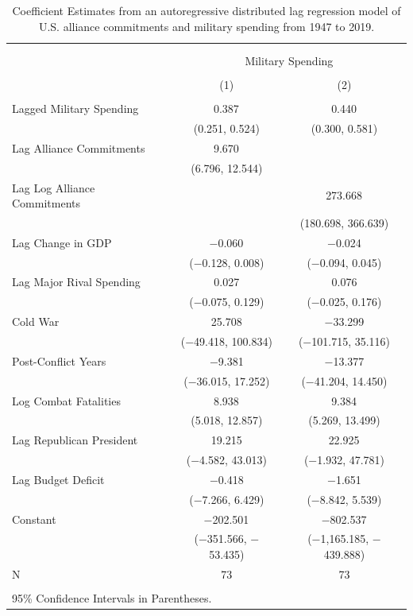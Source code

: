 \documentclass[12pt,hidelinks]{article}
\begin{document}
\begin{table}[!htbp] \centering 
\begin{tabular}{@{\extracolsep{5pt}}lcc} 
\\[-1.8ex]\hline \\[-1.8ex] 
\\[-1.8ex] & \multicolumn{2}{c}{Military Spending} \\ 
\\[-1.8ex] & (1) & (2)\\ 
\hline \\[-1.8ex] 
 Lagged Military Spending & 0.387$^{}$ & 0.440$^{}$ \\ 
  & (0.251, 0.524) & (0.300, 0.581) \\ 
  Lag Alliance Commitments & 9.670$^{}$ &  \\ 
  & (6.796, 12.544) &  \\ 
  Lag Log Alliance Commitments &  & 273.668$^{}$ \\ 
  &  & (180.698, 366.639) \\ 
  Lag Change in GDP & $-$0.060$^{}$ & $-$0.024 \\ 
  & ($-$0.128, 0.008) & ($-$0.094, 0.045) \\ 
  Lag Major Rival Spending & 0.027 & 0.076 \\ 
  & ($-$0.075, 0.129) & ($-$0.025, 0.176) \\ 
  Cold War & 25.708 & $-$33.299 \\ 
  & ($-$49.418, 100.834) & ($-$101.715, 35.116) \\ 
  Post-Conflict Years & $-$9.381 & $-$13.377 \\ 
  & ($-$36.015, 17.252) & ($-$41.204, 14.450) \\ 
  Log Combat Fatalities & 8.938$^{}$ & 9.384$^{}$ \\ 
  & (5.018, 12.857) & (5.269, 13.499) \\ 
  Lag Republican President & 19.215 & 22.925$^{}$ \\ 
  & ($-$4.582, 43.013) & ($-$1.932, 47.781) \\ 
  Lag Budget Deficit & $-$0.418 & $-$1.651 \\ 
  & ($-$7.266, 6.429) & ($-$8.842, 5.539) \\ 
  Constant & $-$202.501$^{}$ & $-$802.537$^{}$ \\ 
  & ($-$351.566, $-$53.435) & ($-$1,165.185, $-$439.888) \\ 
 N & 73 & 73 \\ 
\hline \\[-1.8ex] 
\multicolumn{3}{l}{95\% Confidence Intervals in Parentheses.} \\ 
\end{tabular} 
\caption{Coefficient Estimates from an autoregressive distributed lag regression model of U.S. alliance commitments and military spending from 1947 to 2019.
                   } 
\label{tab:adl-coefs}
\end{table}
\end{document}
